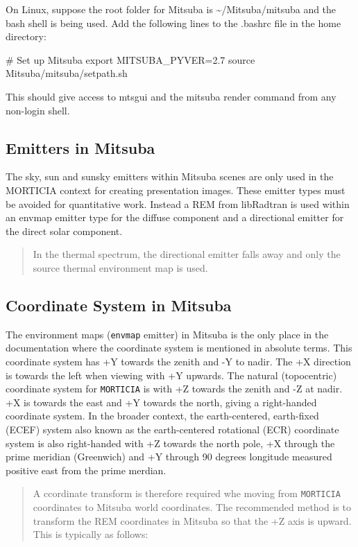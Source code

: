On Linux, suppose the root folder for Mitsuba is
\textasciitilde{}/Mitsuba/mitsuba and the bash shell is being used. Add
the following lines to the .bashrc file in the home directory:

\# Set up Mitsuba export MITSUBA\_PYVER=2.7 source
Mitsuba/mitsuba/setpath.sh

This should give access to mtsgui and the mitsuba render command from
any non-login shell.

\subsection{Emitters in Mitsuba}\label{emitters-in-mitsuba}

The sky, sun and sunsky emitters within Mitsuba scenes are only used in
the MORTICIA context for creating presentation images. These emitter
types must be avoided for quantitative work. Instead a REM from
libRadtran is used within an envmap emitter type for the diffuse
component and a directional emitter for the direct solar component.

\begin{quote}
In the thermal spectrum, the directional emitter falls away and only the
source thermal environment map is used.
\end{quote}

\subsection{Coordinate System in
Mitsuba}\label{coordinate-system-in-mitsuba}

The environment maps (\texttt{envmap} emitter) in Mitsuba is the only
place in the documentation where the coordinate system is mentioned in
absolute terms. This coordinate system has +Y towards the zenith and -Y
to nadir. The +X direction is towards the left when viewing with +Y
upwards. The natural (topocentric) coordinate system for
\texttt{MORTICIA} is with +Z towards the zenith and -Z at nadir. +X is
towards the east and +Y towards the north, giving a right-handed
coordinate system. In the broader context, the earth-centered,
earth-fixed (ECEF) system also known as the earth-centered rotational
(ECR) coordinate system is also right-handed with +Z towards the north
pole, +X through the prime meridian (Greenwich) and +Y through 90
degrees longitude measured positive east from the prime merdian.

\begin{quote}
A ccordinate transform is therefore required whe moving from
\texttt{MORTICIA} coordinates to Mitsuba world coordinates. The
recommended method is to transform the REM coordinates in Mitsuba so
that the +Z axis is upward. This is typically as follows:
\end{quote}

